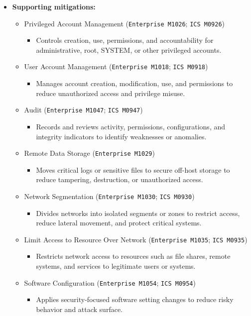 \documentclass[10pt,a4paper,oneside]{report}
\begin{document}
\begin{itemize}
\item \textbf{Supporting mitigations:}
\begin{itemize}
\item Privileged Account Management (\texttt{Enterprise M1026}; \texttt{ICS M0926})
\begin{itemize}
\item Controls creation, use, permissions, and accountability for administrative, root, SYSTEM, or other privileged accounts.
\end{itemize}
\item User Account Management (\texttt{Enterprise M1018}; \texttt{ICS M0918})
\begin{itemize}
\item Manages account creation, modification, use, and permissions to reduce unauthorized access and privilege misuse.
\end{itemize}
\item Audit (\texttt{Enterprise M1047}; \texttt{ICS M0947})
\begin{itemize}
\item Records and reviews activity, permissions, configurations, and integrity indicators to identify weaknesses or anomalies.
\end{itemize}
\item Remote Data Storage (\texttt{Enterprise M1029})
\begin{itemize}
\item Moves critical logs or sensitive files to secure off-host storage to reduce tampering, destruction, or unauthorized access.
\end{itemize}
\item Network Segmentation (\texttt{Enterprise M1030}; \texttt{ICS M0930})
\begin{itemize}
\item Divides networks into isolated segments or zones to restrict access, reduce lateral movement, and protect critical systems.
\end{itemize}
\item Limit Access to Resource Over Network (\texttt{Enterprise M1035}; \texttt{ICS M0935})
\begin{itemize}
\item Restricts network access to resources such as file shares, remote systems, and services to legitimate users or systems.
\end{itemize}
\item Software Configuration (\texttt{Enterprise M1054}; \texttt{ICS M0954})
\begin{itemize}
\item Applies security-focused software setting changes to reduce risky behavior and attack surface.
\end{itemize}
\end{itemize}
\end{itemize}
\end{document}
